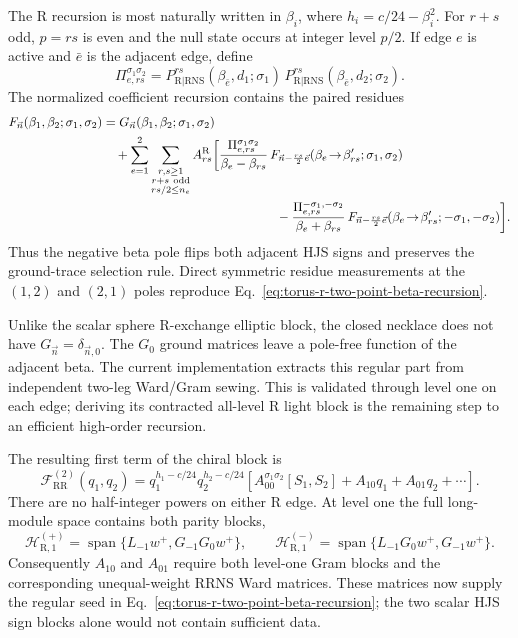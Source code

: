 \documentclass[11pt]{article}
\newcommand{\NS}{\mathrm{NS}}
\newcommand{\R}{\mathrm{R}}
\newcommand{\F}{\mathcal F}
\begin{document}
The R recursion is most naturally written in
$\beta_i$, where $h_i=c/24-\beta_i^2$.  For $r+s$ odd, $p=rs$ is even and
the null state occurs at integer level $p/2$.  If edge $e$ is active and
$\bar e$ is the adjacent edge, define
\[
 \Pi_{e,rs}^{\sigma_1\sigma_2}
 =P_{\R|\R\NS}^{rs}(\beta_{\bar e},d_1;\sigma_1)
  \,P_{\R|\R\NS}^{rs}(\beta_{\bar e},d_2;\sigma_2).
\]
The normalized coefficient recursion contains the paired residues
\begin{equation}
\begin{aligned}
 F_{\vec n}(\beta_1,\beta_2;\sigma_1,\sigma_2)
 &=G_{\vec n}(\beta_1,\beta_2;\sigma_1,\sigma_2)\\
 &\quad+\sum_{e=1}^2\sum_{\substack{r,s\geq1\\r+s\ {\rm odd}\\
                         rs/2\leq n_e}}
 A_{rs}^{\R}\bigg[
 \frac{\Pi_{e,rs}^{\sigma_1\sigma_2}}
      {\beta_e-\beta_{rs}}\,
 F_{\vec n-\frac{rs}{2}\vec e}
   (\beta_e\!\to\!\beta'_{rs};\sigma_1,\sigma_2)
 \\
 &\hspace{48mm}
 -\frac{\Pi_{e,rs}^{-\sigma_1,-\sigma_2}}
       {\beta_e+\beta_{rs}}\,
 F_{\vec n-\frac{rs}{2}\vec e}
   (\beta_e\!\to\!\beta'_{rs};-\sigma_1,-\sigma_2)
 \bigg].
\end{aligned}
\label{eq:torus-r-two-point-beta-recursion}
\end{equation}
Thus the negative beta pole flips both adjacent HJS signs and preserves the
ground-trace selection rule.  Direct symmetric residue measurements at the
$(1,2)$ and $(2,1)$ poles reproduce
Eq.~\eqref{eq:torus-r-two-point-beta-recursion}.

Unlike the scalar sphere R-exchange elliptic block, the closed necklace does
not have $G_{\vec n}=\delta_{\vec n,0}$.  The $G_0$ ground matrices leave a
pole-free function of the adjacent beta.  The current implementation
extracts this regular part from independent two-leg Ward/Gram sewing.  This
is validated through level one on each edge; deriving its contracted
all-level R light block is the remaining step to an efficient high-order
recursion.

The resulting first term of the chiral block is
\begin{equation}
 \F_{\R\R}^{(2)}(q_1,q_2)
 =q_1^{h_1-c/24}q_2^{h_2-c/24}
 \left[A_{00}^{\sigma_1\sigma_2}[S_1,S_2]
 +A_{10}q_1+A_{01}q_2+\cdots\right].
 \label{eq:torus-r-two-point-ground-block}
\end{equation}
There are no half-integer powers on either R edge.  At level one the full
long-module space contains both parity blocks,
\[
 \mathcal H_{\R,1}^{(+)}
 =\operatorname{span}\{L_{-1}w^+,G_{-1}G_0w^+\},
 \qquad
 \mathcal H_{\R,1}^{(-)}
 =\operatorname{span}\{L_{-1}G_0w^+,G_{-1}w^+\}.
\]
Consequently $A_{10}$ and $A_{01}$ require both level-one Gram blocks and
the corresponding unequal-weight RRNS Ward matrices.  These matrices now
supply the regular seed in
Eq.~\eqref{eq:torus-r-two-point-beta-recursion}; the two scalar HJS sign
blocks alone would not contain sufficient data.
\end{document}
